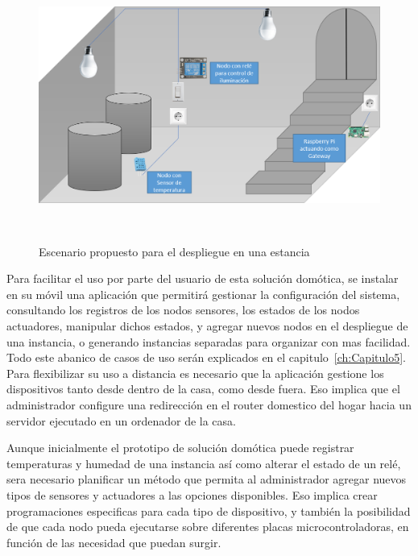 \vspace{0.5cm}
\begin{figure}[hbt!]
\label{scenary_proposal}
\centering
\includegraphics[height=3.5in]{figures/escenario_propuesto_comentado.png}
\caption[Escenario propuesto para el despliegue en una estancia]{Escenario propuesto para el despliegue en una estancia}
\end{figure}

\vspace{1cm}

Para facilitar el uso por parte del usuario de esta solución domótica, se instalar en su móvil una aplicación que permitirá gestionar la configuración del sistema, consultando los registros de los nodos sensores, los estados de los nodos actuadores, manipular dichos estados, y agregar nuevos nodos en el despliegue de una instancia, o generando instancias separadas para organizar con mas facilidad. Todo este abanico de casos de uso serán explicados en el capitulo~\ref{ch:Capitulo5}. Para flexibilizar su uso a distancia es necesario que la aplicación gestione los dispositivos tanto desde dentro de la casa, como desde fuera. Eso implica que el administrador configure una redirección en el router domestico del hogar hacia un servidor ejecutado en un ordenador de la casa.

\vspace{1cm}

Aunque inicialmente el prototipo de solución domótica puede registrar temperaturas y humedad de una instancia así como alterar el estado de un relé, sera necesario planificar un método que permita al administrador agregar nuevos tipos de sensores y actuadores a las opciones disponibles. Eso implica crear programaciones especificas para cada tipo de dispositivo, y también la posibilidad de que cada nodo pueda ejecutarse sobre diferentes placas microcontroladoras, en función de las necesidad que puedan surgir.


